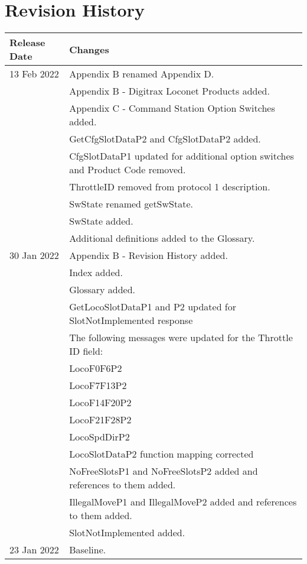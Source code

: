  

\chapter[Revision History]{Revision History}

\begin{tabular}{|p{3cm}|p{13cm}|}
\hline
\textbf{Release Date} & \textbf{Changes} \\
\hline
13 Feb 2022 & Appendix B renamed Appendix D.\\
& Appendix B - Digitrax Loconet Products added.\\
& Appendix C - Command Station Option Switches added.\\
& GetCfgSlotDataP2 and CfgSlotDataP2 added.\\
& CfgSlotDataP1 updated for additional option switches and Product Code removed.\\
& ThrottleID removed from protocol 1 description.\\
& SwState renamed getSwState.\\
& SwState added.\\
& Additional definitions added to the Glossary.\\
\hline
30 Jan 2022 & Appendix B - Revision History added.\\
& Index added.\\
& Glossary added.\\
& GetLocoSlotDataP1 and P2 updated for SlotNotImplemented response\\
& The following messages were updated for the Throttle ID field:\\
&   LocoF0F6P2\\
&   LocoF7F13P2\\
&   LocoF14F20P2\\
&   LocoF21F28P2\\
&   LocoSpdDirP2\\
& LocoSlotDataP2 function mapping corrected\\
& NoFreeSlotsP1 and NoFreeSlotsP2 added and references to them added.\\
& IllegalMoveP1 and IllegalMoveP2 added and references to them added.\\
& SlotNotImplemented added.\\
\hline
23 Jan 2022 & Baseline.\\
\hline
\end{tabular}

